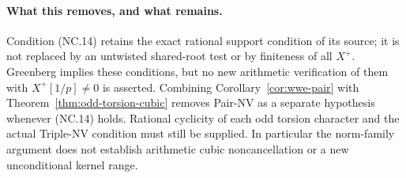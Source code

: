 \paragraph{What this removes, and what remains.}
Condition (NC.14) retains the exact rational support condition
of its source; it is not replaced by an untwisted shared-root
test or by finiteness of all \(X^+\).
Greenberg implies these conditions, but no new arithmetic
verification of them with \(X^+[1/p]\ne0\) is asserted.
Combining Corollary~\ref{cor:wwe-pair} with
Theorem~\ref{thm:odd-torsion-cubic} removes Pair-NV as a separate
hypothesis whenever (NC.14) holds.  Rational cyclicity of each
odd torsion character and the actual Triple-NV condition must
still be supplied.  In particular the norm-family argument
does not establish arithmetic cubic noncancellation or a new
unconditional kernel range.
